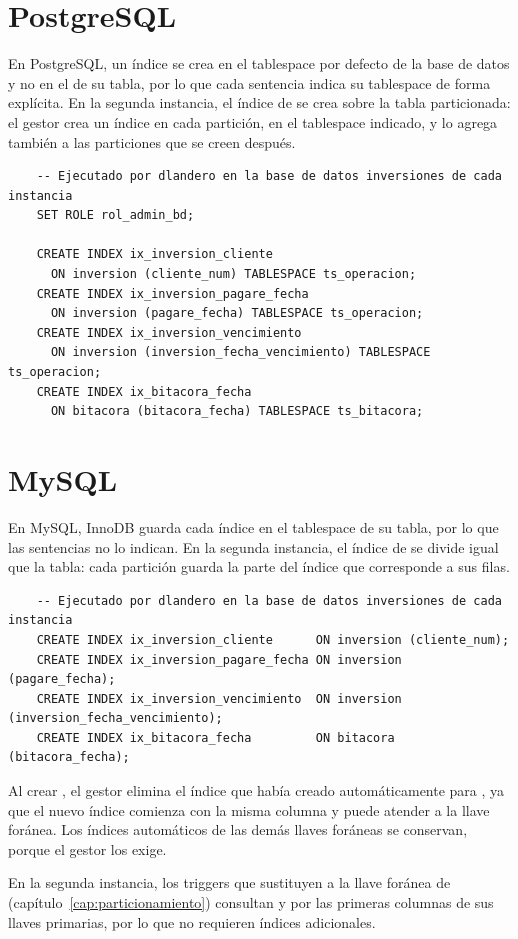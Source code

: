 \section{PostgreSQL}

En PostgreSQL, un índice se crea en el tablespace por defecto de la base de datos y no en el de su tabla, por lo que cada sentencia indica su tablespace de forma explícita. En la segunda instancia, el índice de  se crea sobre la tabla particionada: el gestor crea un índice en cada partición, en el tablespace indicado, y lo agrega también a las particiones que se creen después.

\begin{verbatim}
	-- Ejecutado por dlandero en la base de datos inversiones de cada instancia
	SET ROLE rol_admin_bd;

	CREATE INDEX ix_inversion_cliente
	  ON inversion (cliente_num) TABLESPACE ts_operacion;
	CREATE INDEX ix_inversion_pagare_fecha
	  ON inversion (pagare_fecha) TABLESPACE ts_operacion;
	CREATE INDEX ix_inversion_vencimiento
	  ON inversion (inversion_fecha_vencimiento) TABLESPACE ts_operacion;
	CREATE INDEX ix_bitacora_fecha
	  ON bitacora (bitacora_fecha) TABLESPACE ts_bitacora;
\end{verbatim}

\section{MySQL}

En MySQL, InnoDB guarda cada índice en el tablespace de su tabla, por lo que las sentencias no lo indican. En la segunda instancia, el índice de  se divide igual que la tabla: cada partición guarda la parte del índice que corresponde a sus filas.

\begin{verbatim}
	-- Ejecutado por dlandero en la base de datos inversiones de cada instancia
	CREATE INDEX ix_inversion_cliente      ON inversion (cliente_num);
	CREATE INDEX ix_inversion_pagare_fecha ON inversion (pagare_fecha);
	CREATE INDEX ix_inversion_vencimiento  ON inversion (inversion_fecha_vencimiento);
	CREATE INDEX ix_bitacora_fecha         ON bitacora (bitacora_fecha);
\end{verbatim}

Al crear , el gestor elimina el índice que había creado automáticamente para , ya que el nuevo índice comienza con la misma columna y puede atender a la llave foránea. Los índices automáticos de las demás llaves foráneas se conservan, porque el gestor los exige.

En la segunda instancia, los triggers que sustituyen a la llave foránea de  (capítulo~\ref{cap:particionamiento}) consultan  y  por las primeras columnas de sus llaves primarias, por lo que no requieren índices adicionales.
